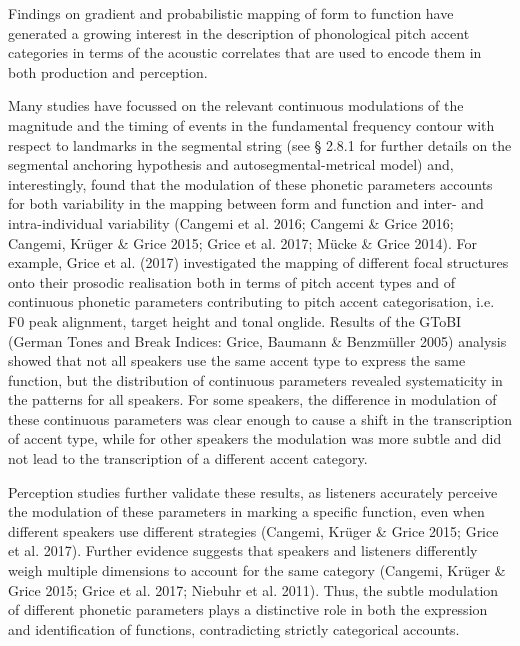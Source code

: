 \begin{styleStandard}
Findings on gradient and probabilistic mapping of form to function have generated a growing interest in the description of phonological pitch accent categories in terms of the acoustic correlates that are used to encode them in both production and perception.
\end{styleStandard}

\begin{styleStandard}
Many studies have focussed on the relevant continuous modulations of the magnitude and the timing of events in the fundamental frequency contour with respect to landmarks in the segmental string (see § 2.8.1 for further details on the segmental anchoring hypothesis and autosegmental-metrical model) and, interestingly, found that the modulation of these phonetic parameters accounts for both variability in the mapping between form and function and inter- and intra-individual variability (Cangemi et al. 2016; Cangemi \& Grice 2016; Cangemi, Krüger \& Grice 2015; Grice et al. 2017; Mücke \& Grice 2014). For example, Grice et al. (2017) investigated the mapping of different focal structures onto their prosodic realisation both in terms of pitch accent types and of continuous phonetic parameters contributing to pitch accent categorisation, i.e. F0 peak alignment, target height and tonal onglide. Results of the GToBI (German Tones and Break Indices: Grice, Baumann \& Benzmüller 2005) analysis showed that not all speakers use the same accent type to express the same function, but the distribution of continuous parameters revealed systematicity in the patterns for all speakers. For some speakers, the difference in modulation of these continuous parameters was clear enough to cause a shift in the transcription of accent type, while for other speakers the modulation was more subtle and did not lead to the transcription of a different accent category.
\end{styleStandard}

\begin{styleStandard}
Perception studies further validate these results, as listeners accurately perceive the modulation of these parameters in marking a specific function, even when different speakers use different strategies (Cangemi, Krüger \& Grice 2015; Grice et al. 2017). Further evidence suggests that speakers and listeners differently weigh multiple dimensions to account for the same category (Cangemi, Krüger \& Grice 2015; Grice et al. 2017; Niebuhr et al. 2011). Thus, the subtle modulation of different phonetic parameters plays a distinctive role in both the expression and identification of functions, contradicting strictly categorical accounts.
\end{styleStandard}

